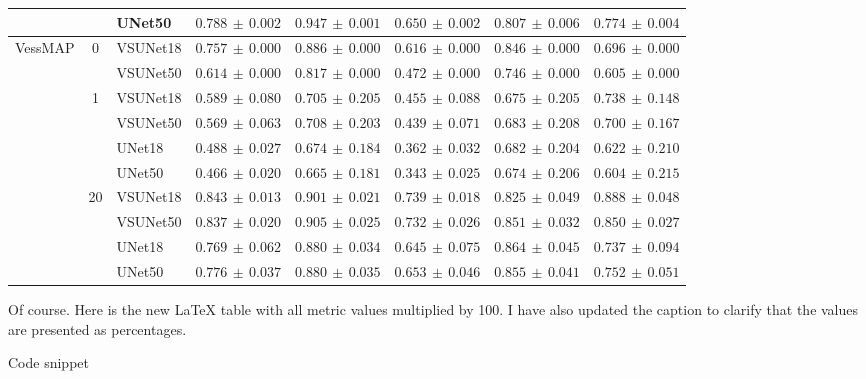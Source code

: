 \documentclass[%
reprint,
nofootinbib,
 amsmath,amssymb,
aps,
superscriptaddress,
showkeys,
longbibliography
]{revtex4-1}
\begin{document}
\begin{table}[t]
\begin{tabular}{l c l l l l l l}
         &  & UNet50 & $0.788 \,\pm\, 0.002$ & $0.947 \,\pm\, 0.001$ & $0.650 \,\pm\, 0.002$ & $0.807 \,\pm\, 0.006$ & $0.774 \,\pm\, 0.004$ \\
        \hline
        \multirow{10}{*}{VessMAP} & \multirow{2}{*}{0} & VSUNet18 & $0.757 \,\pm\, 0.000$ & $0.886 \,\pm\, 0.000$ & $0.616 \,\pm\, 0.000$ & $0.846 \,\pm\, 0.000$ & $0.696 \,\pm\, 0.000$ \\
         &  & VSUNet50 & $0.614 \,\pm\, 0.000$ & $0.817 \,\pm\, 0.000$ & $0.472 \,\pm\, 0.000$ & $0.746 \,\pm\, 0.000$ & $0.605 \,\pm\, 0.000$ \\
         \cline{2-8}
         & \multirow{4}{*}{1} & VSUNet18 & $0.589 \,\pm\, 0.080$ & $0.705 \,\pm\, 0.205$ & $0.455 \,\pm\, 0.088$ & $0.675 \,\pm\, 0.205$ & $0.738 \,\pm\, 0.148$ \\
         &  & VSUNet50 & $0.569 \,\pm\, 0.063$ & $0.708 \,\pm\, 0.203$ & $0.439 \,\pm\, 0.071$ & $0.683 \,\pm\, 0.208$ & $0.700 \,\pm\, 0.167$ \\
         &  & UNet18 & $0.488 \,\pm\, 0.027$ & $0.674 \,\pm\, 0.184$ & $0.362 \,\pm\, 0.032$ & $0.682 \,\pm\, 0.204$ & $0.622 \,\pm\, 0.210$ \\
         &  & UNet50 & $0.466 \,\pm\, 0.020$ & $0.665 \,\pm\, 0.181$ & $0.343 \,\pm\, 0.025$ & $0.674 \,\pm\, 0.206$ & $0.604 \,\pm\, 0.215$ \\
         \cline{2-8}
         & \multirow{4}{*}{20} & VSUNet18 & $0.843 \,\pm\, 0.013$ & $0.901 \,\pm\, 0.021$ & $0.739 \,\pm\, 0.018$ & $0.825 \,\pm\, 0.049$ & $0.888 \,\pm\, 0.048$ \\
         &  & VSUNet50 & $0.837 \,\pm\, 0.020$ & $0.905 \,\pm\, 0.025$ & $0.732 \,\pm\, 0.026$ & $0.851 \,\pm\, 0.032$ & $0.850 \,\pm\, 0.027$ \\
         &  & UNet18 & $0.769 \,\pm\, 0.062$ & $0.880 \,\pm\, 0.034$ & $0.645 \,\pm\, 0.075$ & $0.864 \,\pm\, 0.045$ & $0.737 \,\pm\, 0.094$ \\
         &  & UNet50 & $0.776 \,\pm\, 0.037$ & $0.880 \,\pm\, 0.035$ & $0.653 \,\pm\, 0.046$ & $0.855 \,\pm\, 0.041$ & $0.752 \,\pm\, 0.051$ \\
        \hline
    \end{tabular}
    \endgroup
\end{table}

Of course. Here is the new LaTeX table with all metric values multiplied by 100. I have also updated the caption to clarify that the values are presented as percentages.

Code snippet
\end{document}
